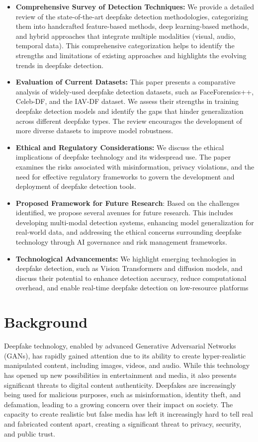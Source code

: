 \documentclass[lettersize,journal]{IEEEtran}
\begin{document}
\begin{itemize}
    \item \textbf{Comprehensive Survey of Detection Techniques:}
We provide a detailed review of the state-of-the-art deepfake detection methodologies, categorizing them into handcrafted feature-based methods, deep learning-based methods, and hybrid approaches that integrate multiple modalities (visual, audio, temporal data). This comprehensive categorization helps to identify the strengths and limitations of existing approaches and highlights the evolving trends in deepfake detection.
    \item \textbf{Evaluation of Current Datasets:} This paper presents a comparative analysis of widely-used deepfake detection datasets, such as FaceForensics++, Celeb-DF, and the IAV-DF dataset. We assess their strengths in training deepfake detection models and identify the gaps that hinder generalization across different deepfake types. The review encourages the development of more diverse datasets to improve model robustness.
    \item \textbf{Ethical and Regulatory Considerations:} We discuss the ethical implications of deepfake technology and its widespread use. The paper examines the risks associated with misinformation, privacy violations, and the need for effective regulatory frameworks to govern the development and deployment of deepfake detection tools.
    \item \textbf{Proposed Framework for Future Research}:
Based on the challenges identified, we propose several avenues for future research. This includes developing multi-modal detection systems, enhancing model generalization for real-world data, and addressing the ethical concerns surrounding deepfake technology through AI governance and risk management frameworks.
    \item \textbf{Technological Advancements:}
We highlight emerging technologies in deepfake detection, such as Vision Transformers and diffusion models, and discuss their potential to enhance detection accuracy, reduce computational overhead, and enable real-time deepfake detection on low-resource platforms
\end{itemize}

\section{Background}
\noindent Deepfake technology, enabled by advanced Generative Adversarial Networks (GANs), has rapidly gained attention due to its ability to create hyper-realistic manipulated content, including images, videos, and audio. While this technology has opened up new possibilities in entertainment and media, it also presents significant threats to digital content authenticity. Deepfakes are increasingly being used for malicious purposes, such as misinformation, identity theft, and defamation, leading to a growing concern over their impact on society. The capacity to create realistic but false media has left it increasingly hard to tell real and fabricated content apart, creating a significant threat to privacy, security, and public trust.
\end{document}
